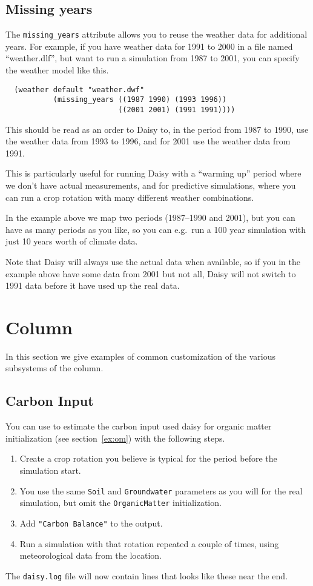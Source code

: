 \documentclass[a4paper,11pt]{article}
\begin{document}
\subsection{Missing years}

The \texttt{missing\_years} attribute allows you to reuse the weather
data for additional years.  For example, if you have weather data for
1991 to 2000 in a file named ``weather.dlf'', but want to run a
simulation from 1987 to 2001, you can specify the weather model like
this.
\begin{verbatim}
  (weather default "weather.dwf"
           (missing_years ((1987 1990) (1993 1996))
                          ((2001 2001) (1991 1991))))
\end{verbatim}
This should be read as an order to Daisy to, in the period from 1987
to 1990, use the weather data from 1993 to 1996, and for 2001 use the
weather data from 1991.

This is particularly useful for running Daisy with a ``warming up''
period where we don't have actual measurements, and for predictive
simulations, where you can run a crop rotation with many different
weather combinations.

In the example above we map two periods (1987--1990 and 2001), but you
can have as many periods as you like, so you can e.g.\ run a 100 year
simulation with just 10 years worth of climate data.

Note that Daisy will always use the actual data when available, so if
you in the example above have some data from 2001 but not all, Daisy
will not switch to 1991 data before it have used up the real data.

\section{Column}
\label{sec:column}

In this section we give examples of common customization of the
various subsystems of the column.

\subsection{Carbon Input}
\label{sec:om}

You can use \daisy{} to estimate the carbon input used daisy{} for
organic matter initialization (see section~\ref{ex:om}) with the
following steps.
\begin{enumerate}
\item Create a crop rotation you believe is typical for the period
  before the simulation start.
\item You use the same \texttt{Soil} and \texttt{Groundwater}
  parameters as you will for the real simulation, but omit the
  \texttt{OrganicMatter} initialization.
\item Add \texttt{"Carbon Balance"} to the output.
\item Run a simulation with that rotation repeated a couple of times,
  using meteorological data from the location.
\end{enumerate}
The \texttt{daisy.log} file will now contain lines that looks like
these near the end.
\end{document}
